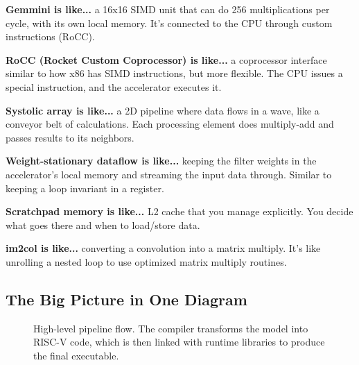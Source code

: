 \documentclass[12pt,a4paper]{article}
\begin{document}
\begin{sidebarbox}
\small
\textbf{Gemmini is like...} a 16x16 SIMD unit that can do 256 multiplications per cycle, with its own local memory. It's connected to the CPU through custom instructions (RoCC).

\textbf{RoCC (Rocket Custom Coprocessor) is like...} a coprocessor interface similar to how x86 has SIMD instructions, but more flexible. The CPU issues a special instruction, and the accelerator executes it.

\textbf{Systolic array is like...} a 2D pipeline where data flows in a wave, like a conveyor belt of calculations. Each processing element does multiply-add and passes results to its neighbors.

\textbf{Weight-stationary dataflow is like...} keeping the filter weights in the accelerator's local memory and streaming the input data through. Similar to keeping a loop invariant in a register.

\textbf{Scratchpad memory is like...} L2 cache that you manage explicitly. You decide what goes there and when to load/store data.

\textbf{im2col is like...} converting a convolution into a matrix multiply. It's like unrolling a nested loop to use optimized matrix multiply routines.
\end{sidebarbox}

\subsection*{The Big Picture in One Diagram}

\begin{figure}[H]
\centering
{}
\caption{High-level pipeline flow. The compiler transforms the model into RISC-V code, which is then linked with runtime libraries to produce the final executable.}
\end{figure}
\end{document}
